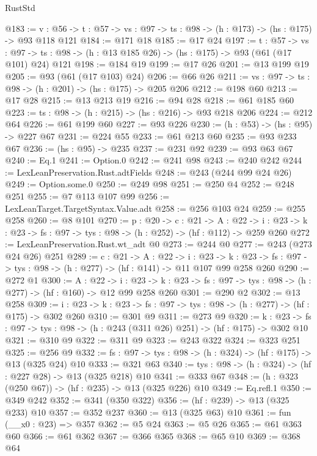 \begin{lexlean}{RustStd}
\begin{coremodule}
@183 := {v : @56} ->
  {t : @57} -> {vs : @97} -> {ts : @98} -> (h : @173) -> (hs : @175) -> @93 @118 @121
@184 := @171 @18
@185 := @17 @24
@197 := {t : @57} ->
  {vs : @97} -> {ts : @98} -> (h : @13 @185 @26) -> (hs : @175) -> @93 (@61 (@17 @101) @24) @121
@198 := @184 @19
@199 := @17 @26
@201 := @13 @199 @19
@205 := @93 (@61 (@17 @103) @24)
@206 := @66 @26
@211 := {vs : @97} -> {ts : @98} -> (h : @201) -> (hs : @175) -> @205 @206
@212 := @198 @60
@213 := @17 @28
@215 := @13 @213 @19
@216 := @94 @28
@218 := @61 @185 @60
@223 := {ts : @98} -> (h : @215) -> (hs : @216) -> @93 @218 @206
@224 := @212 @64
@226 := @61 @199 @60
@227 := @93 @226
@230 := (h : @53) -> (hs : @95) -> @227 @67
@231 := @224 @55
@233 := @61 @213 @60
@235 := @93 @233 @67
@236 := (hs : @95) -> @235
@237 := @231 @92
@239 := @93 @63 @67
@240 := Eq.{1}
@241 := Option.{0}
@242 := @241 @98
@243 := @240 @242
@244 := LexLeanPreservation.Rust.adtFields
@248 := @243 (@244 @99 @24 @26)
@249 := Option.some.{0}
@250 := @249 @98
@251 := @250 @4
@252 := @248 @251
@255 := @7 @113 @107 @99
@256 := LexLeanTarget.TargetSyntax.Value.adt
@258 := @256 @103 @24
@259 := @255 @258
@260 := @8 @101
@270 := {p : @20} ->
  {c : @21} ->
  {A : @22} ->
  {i : @23} -> {k : @23} -> {fs : @97} -> {tys : @98} -> (h : @252) -> (hf : @112) -> @259 @260
@272 := LexLeanPreservation.Rust.wt_adt @0
@273 := @244 @0
@277 := @243 (@273 @24 @26) @251
@289 := {c : @21} ->
  {A : @22} ->
  {i : @23} ->
  {k : @23} -> {fs : @97} -> {tys : @98} -> (h : @277) -> (hf : @141) -> @11 @107 @99 @258 @260
@290 := @272 @1
@300 := {A : @22} ->
  {i : @23} ->
  {k : @23} -> {fs : @97} -> {tys : @98} -> (h : @277) -> (hf : @160) -> @12 @99 @258 @260
@301 := @290 @2
@302 := @13 @258
@309 := {i : @23} ->
  {k : @23} -> {fs : @97} -> {tys : @98} -> (h : @277) -> (hf : @175) -> @302 @260
@310 := @301 @9
@311 := @273 @9
@320 := {k : @23} ->
  {fs : @97} -> {tys : @98} -> (h : @243 (@311 @26) @251) -> (hf : @175) -> @302 @10
@321 := @310 @9
@322 := @311 @9
@323 := @243 @322
@324 := @323 @251
@325 := @256 @9
@332 := {fs : @97} -> {tys : @98} -> (h : @324) -> (hf : @175) -> @13 (@325 @24) @10
@333 := @321 @63
@340 := {tys : @98} -> (h : @324) -> (hf : @227 @28) -> @13 (@325 @218) @10
@341 := @333 @67
@348 := (h : @323 (@250 @67)) -> (hf : @235) -> @13 (@325 @226) @10
@349 := Eq.refl.{1}
@350 := @349 @242
@352 := @341 (@350 @322)
@356 := (hf : @239) -> @13 (@325 @233) @10
@357 := @352 @237
@360 := @13 (@325 @63) @10
@361 := fun (__x0 : @23) => @357
@362 := @5 @24
@363 := @5 @26
@365 := @61 @363 @60
@366 := @61 @362
@367 := @366 @365
@368 := @65 @10
@369 := @368 @64

\end{coremodule}
\end{lexlean}
